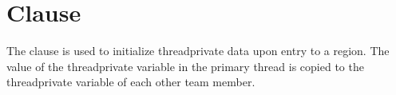 \section{ Clause}
\label{sec:copyin}

The  clause is used to initialize threadprivate data upon entry 
to a  region. The value of the threadprivate variable in the primary
thread is copied to the threadprivate variable of each other team member.





